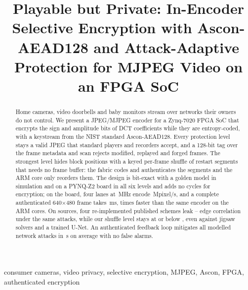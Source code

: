 \documentclass[conference]{IEEEtran}
\begin{document}
\title{Playable but Private: In-Encoder Selective Encryption with Ascon-AEAD128 and Attack-Adaptive Protection for MJPEG Video on an FPGA SoC}

\author{
}

\maketitle

\begin{abstract}
Home cameras, video doorbells and baby monitors stream over networks their owners do not control. We present a JPEG/MJPEG encoder for a Zynq-7020 FPGA SoC that encrypts the sign and amplitude bits of DCT coefficients while they are entropy-coded, with a keystream from the NIST standard Ascon-AEAD128. Every protection level stays a valid JPEG that standard players and recorders accept, and a 128-bit tag over the frame metadata and scan rejects modified, replayed and forged frames. The strongest level hides block positions with a keyed per-frame shuffle of restart segments that needs no frame buffer: the fabric codes and authenticates the segments and the ARM core only reorders them. The design is bit-exact with a golden model in simulation and on a PYNQ-Z2 board in all six levels and adds no cycles for encryption; on the board, four lanes at \BdFourMhz\,MHz encode \BdFourBusyMpix\,Mpixel/s, and a complete authenticated 640$\times$480 frame takes \BdFourZcMs\,ms, \BdSpeedupFrame{} times faster than the same encoder on the ARM cores. On \BenchSources{} sources, four re-implemented published schemes leak \BenchPubMin--\BenchPubMax{} edge correlation under the same attacks, while our shuffle level stays at or below \BenchEfiveMax{}, even against jigsaw solvers and a trained U-Net. An authenticated feedback loop mitigates all \NumAttacks{} modelled network attacks in \TtmMean\,s on average with no false alarms.
\end{abstract}

\begin{IEEEkeywords}
consumer cameras, video privacy, selective encryption, MJPEG, Ascon, FPGA, authenticated encryption
\end{IEEEkeywords}

\end{document}
